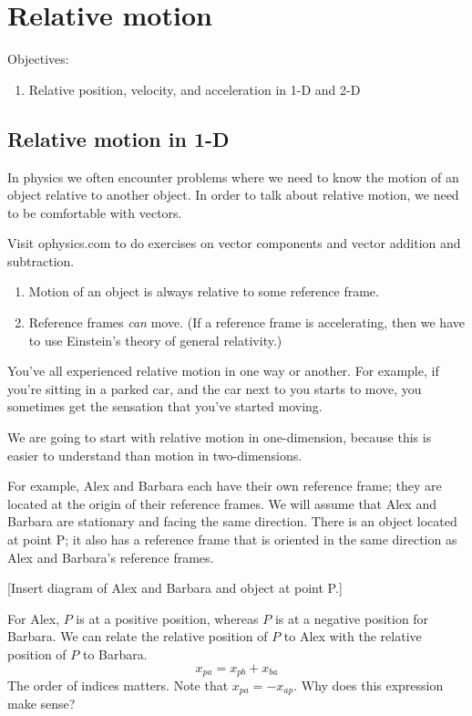 \section{Relative motion}
Objectives:
\begin{enumerate}
\item Relative position, velocity, and acceleration in 1-D and 2-D
\end{enumerate}

\subsection{Relative motion in 1-D}
In physics we often encounter problems where we need to know the motion of an object relative to another object. In order to talk about relative motion, we need to be comfortable with vectors.

Visit ophysics.com to do exercises on vector components and vector addition and subtraction.


\begin{enumerate}
\item Motion of an object is always relative to some reference frame. 
\item Reference frames \textit{can} move. (If a reference frame is accelerating, then we have to use Einstein's theory of general relativity.)
\end{enumerate}

You've all experienced relative motion in one way or another. For example, if you're sitting in a parked car, and the car next to you starts to move, you sometimes get the sensation that you've started moving.

We are going to start with relative motion in one-dimension, because this is easier to understand than motion in two-dimensions.

For example, Alex and Barbara each have their own reference frame; they are located at the origin of their reference frames. We will assume that Alex and Barbara are stationary and facing the same direction. There is an object located at point P; it also has a reference frame that is oriented in the same direction as Alex and Barbara's reference frames.

[Insert diagram of Alex and Barbara and object at point P.]
\vspace{4cm}


For Alex, $P$ is at a positive position, whereas $P$ is at a negative position for Barbara. We can relate the relative position of $P$ to Alex with the relative position of $P$ to Barbara.
$$x_{pa}=x_{pb}+x_{ba}$$
The order of indices matters. Note that $x_{pa}=-x_{ap}$. Why does this expression make sense?

